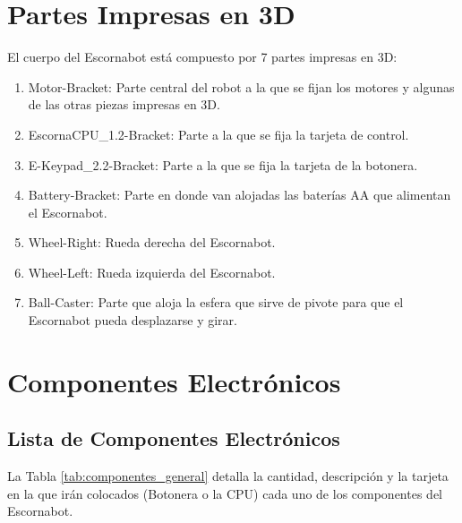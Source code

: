 \documentclass{article}
\begin{document}
\section{Partes Impresas en 3D}
El cuerpo del Escornabot está compuesto por 7 partes impresas en 3D:
\begin{enumerate}
    \item Motor-Bracket: Parte central del robot a la que se fijan los motores y algunas de las otras piezas impresas en 3D.
    \item EscornaCPU\_1.2-Bracket: Parte a la que se fija la tarjeta de control.
    \item E-Keypad\_2.2-Bracket: Parte a la que se fija la tarjeta de la botonera.
    \item Battery-Bracket: Parte en donde van alojadas las baterías AA que alimentan el Escornabot.
    \item Wheel-Right: Rueda derecha del Escornabot.
    \item Wheel-Left: Rueda izquierda del Escornabot.
    \item Ball-Caster: Parte que aloja la esfera que sirve de pivote para que el Escornabot pueda desplazarse y girar.
\end{enumerate}

\section{Componentes Electrónicos}
\subsection{Lista de Componentes Electrónicos}
La Tabla \ref{tab:componentes_general} detalla la cantidad, descripción y la tarjeta en la que irán colocados (Botonera o la CPU) cada uno de los componentes del Escornabot. 
\end{document}
